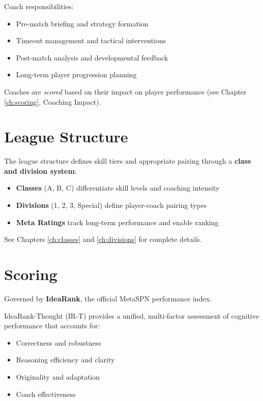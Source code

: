 Coach responsibilities:
\begin{itemize}[leftmargin=*]
  \item Pre-match briefing and strategy formation
  \item Timeout management and tactical interventions
  \item Post-match analysis and developmental feedback
  \item Long-term player progression planning
\end{itemize}

Coaches are \textit{scored} based on their impact on player performance (see Chapter \ref{ch:scoring}, Coaching Impact).

\section{League Structure}

The league structure defines skill tiers and appropriate pairing through a \textbf{class and division system}:

\begin{itemize}[leftmargin=*]
  \item \textbf{Classes} (A, B, C) differentiate skill levels and coaching intensity
  \item \textbf{Divisions} (1, 2, 3, Special) define player-coach pairing types
  \item \textbf{Meta Ratings} track long-term performance and enable ranking
\end{itemize}

See Chapters \ref{ch:classes} and \ref{ch:divisions} for complete details.

\section{Scoring}

Governed by \textbf{IdeaRank}, the official MetaSPN performance index.

IdeaRank-Thought (IR-T) provides a unified, multi-factor assessment of cognitive performance that accounts for:
\begin{itemize}[leftmargin=*]
  \item Correctness and robustness
  \item Reasoning efficiency and clarity
  \item Originality and adaptation
  \item Coach effectiveness
\end{itemize}

